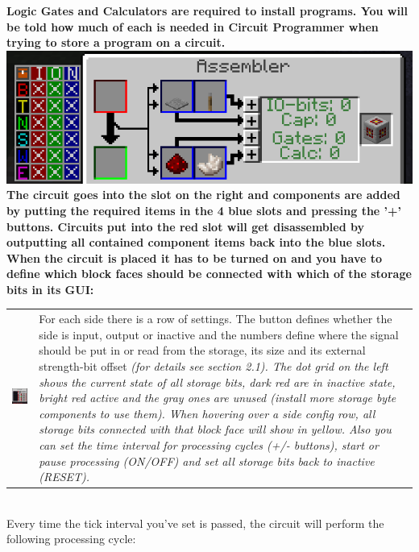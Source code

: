 \documentclass[11pt]{article} %
\makeatletter
\newcommand{\imgtex}{\begin{tabularx}{\textwidth}{@{}c@{ }X@{}}}
\makeatother
\begin{document}
\bf Logic Gates \rm and \bf Calculators \rm are required to install programs. You will be told how much of each is needed in \bf Circuit Programmer \rm when trying to store a program on a circuit.\\
\includegraphics[width = \textwidth]{assembler_gui}\\
The circuit goes into the slot on the right and components are added by putting the required items in the 4 blue slots and pressing the '+' buttons. Circuits put into the red slot will get disassembled by outputting all contained component items back into the blue slots.\\

When the circuit is placed it has to be turned on and you have to define which block faces should be connected with which of the storage bits in its GUI:\\
\imgtex
\includegraphics[align=t]{circuit_gui} & 
For each side there is a row of settings. The button defines whether the side is input, output or inactive and the numbers define where the signal should be put in or read from the storage, its size and its external strength-bit offset \it(for details see section 2.1)\rm . The dot grid on the left shows the current state of all storage bits, dark red are in inactive state, bright red active and the gray ones are unused (install more storage byte components to use them). When hovering over a side config row, all storage bits connected with that block face will show in yellow. Also you can set the time interval for processing cycles (+/- buttons), start or pause processing (ON/OFF) and set all storage bits back to inactive (RESET).
\end{tabularx}\\
Every time the tick interval you've set is passed, the circuit will perform the following processing cycle:
\end{document}
